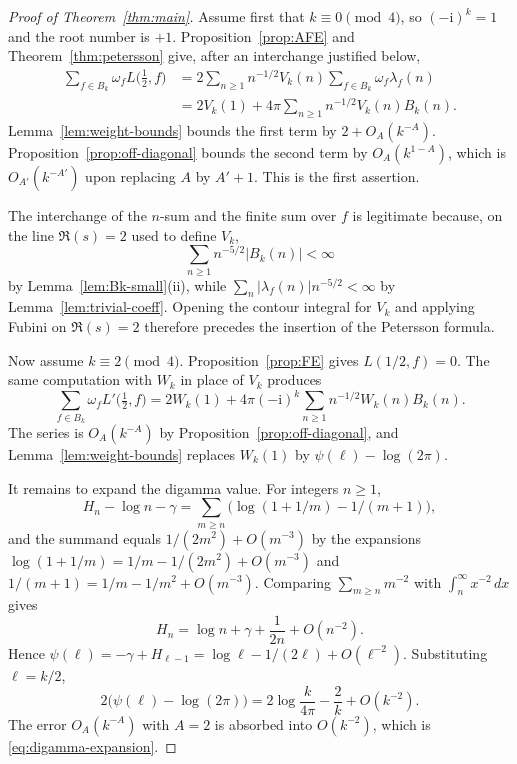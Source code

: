 \documentclass[11pt]{amsart}
\theoremstyle{definition}
\theoremstyle{remark}
\numberwithin{equation}{section}
\newcommand{\ii}{\mathrm{i}}
\begin{document}
\begin{proof}[Proof of Theorem~\ref{thm:main}]
Assume first that $k\equiv 0\pmod 4$, so $(-\ii)^k=1$ and the root number is $+1$. Proposition~\ref{prop:AFE} and Theorem~\ref{thm:petersson} give, after an interchange justified below,
\begin{align*}
\sum_{f\in B_k}\omega_f L\bigl(\tfrac12,f\bigr)
&=2\sum_{n\ge 1}n^{-1/2}V_k(n)\sum_{f\in B_k}\omega_f\lambda_f(n)\\
&=2V_k(1)+4\pi\sum_{n\ge 1}n^{-1/2}V_k(n)B_k(n).
\end{align*}
Lemma~\ref{lem:weight-bounds} bounds the first term by $2+O_A(k^{-A})$. Proposition~\ref{prop:off-diagonal} bounds the second term by $O_A(k^{1-A})$, which is $O_{A'}(k^{-A'})$ upon replacing $A$ by $A'+1$. This is the first assertion.

The interchange of the $n$-sum and the finite sum over $f$ is legitimate because, on the line $\Re(s)=2$ used to define $V_k$, 
\[
\sum_{n\ge 1}n^{-5/2}\lvert B_k(n)\rvert<\infty
\]
by Lemma~\ref{lem:Bk-small}(ii), while $\sum_n\lvert\lambda_f(n)\rvert n^{-5/2}<\infty$ by Lemma~\ref{lem:trivial-coeff}. Opening the contour integral for $V_k$ and applying Fubini on $\Re(s)=2$ therefore precedes the insertion of the Petersson formula.

Now assume $k\equiv 2\pmod 4$. Proposition~\ref{prop:FE} gives $L(1/2,f)=0$. The same computation with $W_k$ in place of $V_k$ produces
\[
\sum_{f\in B_k}\omega_f L'\bigl(\tfrac12,f\bigr)
=2W_k(1)+4\pi(-\ii)^k\sum_{n\ge 1}n^{-1/2}W_k(n)B_k(n).
\]
The series is $O_A(k^{-A})$ by Proposition~\ref{prop:off-diagonal}, and Lemma~\ref{lem:weight-bounds} replaces $W_k(1)$ by $\psi(\ell)-\log(2\pi)$.

It remains to expand the digamma value. For integers $n\ge 1$,
\[
H_n-\log n-\gamma
=\sum_{m\ge n}\bigl(\log(1+1/m)-1/(m+1)\bigr),
\]
and the summand equals $1/(2m^2)+O(m^{-3})$ by the expansions $\log(1+1/m)=1/m-1/(2m^2)+O(m^{-3})$ and $1/(m+1)=1/m-1/m^2+O(m^{-3})$. Comparing $\sum_{m\ge n}m^{-2}$ with $\int_n^\infty x^{-2}\,dx$ gives
\[
H_n=\log n+\gamma+\frac{1}{2n}+O(n^{-2}).
\]
Hence $\psi(\ell)=-\gamma+H_{\ell-1}=\log\ell-1/(2\ell)+O(\ell^{-2})$. Substituting $\ell=k/2$,
\[
2\bigl(\psi(\ell)-\log(2\pi)\bigr)
=2\log\frac{k}{4\pi}-\frac{2}{k}+O(k^{-2}).
\]
The error $O_A(k^{-A})$ with $A=2$ is absorbed into $O(k^{-2})$, which is \eqref{eq:digamma-expansion}.
\end{proof}
\end{document}

